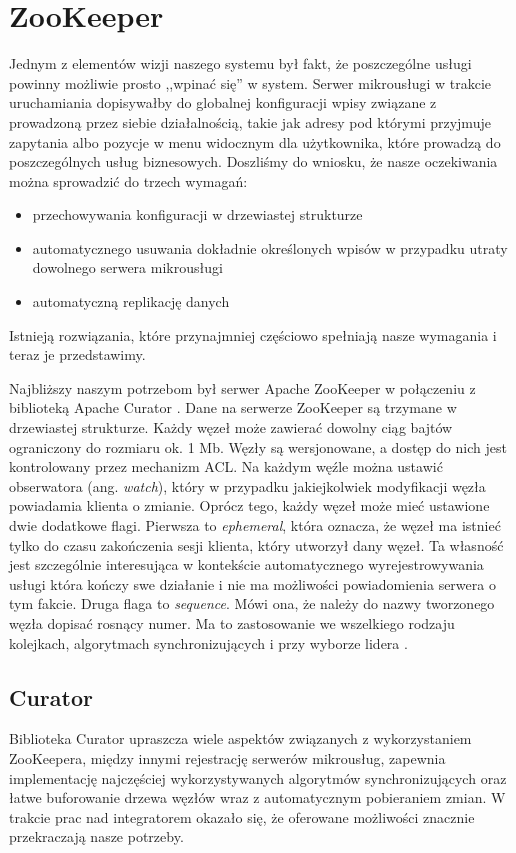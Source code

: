 \documentclass[licencjacka]{pracamgr}
\begin{document}
\section{ZooKeeper}

Jednym z elementów wizji naszego systemu był fakt, że poszczególne usługi
powinny możliwie prosto ,,wpinać się'' w system. Serwer mikrousługi w trakcie
uruchamiania dopisywałby do globalnej konfiguracji wpisy związane z prowadzoną
przez siebie działalnością, takie jak adresy pod którymi przyjmuje zapytania
albo pozycje w menu widocznym dla użytkownika, które prowadzą do poszczególnych
usług biznesowych. Doszliśmy do wniosku, że nasze oczekiwania można sprowadzić
do trzech wymagań:
\begin{itemize}
	\item przechowywania konfiguracji w drzewiastej strukturze
	\item automatycznego usuwania dokładnie określonych wpisów w przypadku
	utraty dowolnego serwera mikrousługi
	\item automatyczną replikację danych
\end{itemize}
Istnieją rozwiązania, które przynajmniej częściowo spełniają nasze wymagania i
teraz je przedstawimy.

Najbliższy naszym potrzebom był serwer Apache ZooKeeper \cite{zookeeper} w
połączeniu z biblioteką Apache Curator \cite{curator}. Dane na serwerze
ZooKeeper są trzymane w drzewiastej strukturze. Każdy węzeł może zawierać dowolny
ciąg bajtów ograniczony do rozmiaru ok. 1 Mb. Węzły są wersjonowane, a dostęp
do nich jest kontrolowany przez mechanizm ACL. Na każdym węźle można ustawić
obserwatora (ang. \textit{watch}), który w przypadku jakiejkolwiek modyfikacji
węzła powiadamia klienta o zmianie. Oprócz tego, każdy węzeł może mieć ustawione
dwie dodatkowe flagi. Pierwsza to \textit{ephemeral}, która oznacza, że węzeł ma
istnieć tylko do czasu zakończenia sesji klienta, który utworzył dany węzeł.
Ta własność jest szczególnie interesująca w kontekście automatycznego
wyrejestrowywania usługi która kończy swe działanie i nie ma możliwości
powiadomienia serwera o tym fakcie. Druga flaga to \textit{sequence}. Mówi ona,
że należy do nazwy tworzonego węzła dopisać rosnący numer. Ma to zastosowanie we
wszelkiego rodzaju kolejkach, algorytmach synchronizujących i przy wyborze
lidera \cite{curatorlock}.

\subsection{Curator}
Biblioteka Curator upraszcza wiele aspektów związanych
z wykorzystaniem ZooKeepera, między innymi rejestrację serwerów mikrousług,
zapewnia implementację najczęściej wykorzystywanych algorytmów synchronizujących
oraz łatwe buforowanie drzewa węzłów wraz z automatycznym pobieraniem zmian. W
trakcie prac nad integratorem okazało się, że oferowane możliwości znacznie przekraczają
nasze potrzeby.
\end{document}

